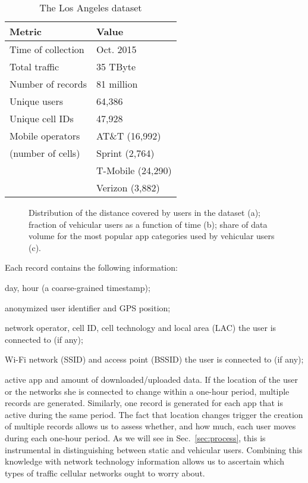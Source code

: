 \documentclass{sig-alternate-05-2015}
\newcommand{\Sec}[1]{Sec.~\ref{sec:#1}}
\let\tempone\itemize
\let\temptwo\enditemize
\renewenvironment{itemize}{\tempone\addtolength{\itemsep}{-0.7\baselineskip}}{\temptwo}
\begin{document}
\begin{table}[]
\caption{
The Los Angeles dataset
\label{tab:dataset}
} \centering
\begin{tabularx}{.8\columnwidth}{|X|X|}
\hline
Metric & Value \\
\hline\hline
Time of collection & Oct. 2015\\
\hline
Total traffic & 35 TByte\\
\hline
Number of records & 81 million\\
\hline
Unique users & 64,386\\
\hline
Unique cell IDs & 47,928\\
\hline
Mobile operators & AT\&T (16,992)\\
(number of cells) & Sprint (2,764)\\
& T-Mobile (24,290)\\
& Verizon (3,882)\\
\hline
\end{tabularx}
\vspace{-4mm}
\end{table}

\begin{figure*}[h!]
\centering
{}   \caption{Distribution of the distance covered by users in the dataset (a); fraction of vehicular users as a function of time (b); share of data volume for the most popular app categories used by vehicular users (c).
\vspace*{-3mm}
} \end{figure*}


Each record contains the following information:
\begin{itemize}
\item day, hour (a coarse-grained timestamp);
\item anonymized user identifier and GPS position;
\item network operator, cell ID, cell technology and local area (LAC) the user is connected to (if any);
\item Wi-Fi network (SSID) and access point (BSSID) the user is connected to (if any);
\item active app and amount of downloaded/uploaded data.
\end{itemize}
If the location of the user or the networks she is connected to change within a one-hour period, multiple records are generated. Similarly, one record is generated for each app that is active during the same period.
The fact that location changes trigger the creation of multiple records allows us to assess whether, and how much, each user moves during each one-hour period. As we will see in \Sec{process}, this is instrumental in distinguishing between static and vehicular users. Combining this knowledge with network technology information allows us to ascertain which types of traffic cellular networks ought to worry about.
\end{document}
